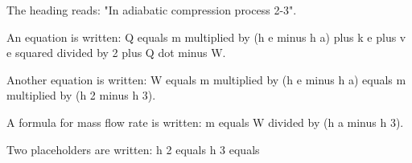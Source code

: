 The heading reads: "In adiabatic compression process 2-3".  

An equation is written:  
Q equals m multiplied by (h e minus h a) plus k e plus v e squared divided by 2 plus Q dot minus W.  

Another equation is written:  
W equals m multiplied by (h e minus h a) equals m multiplied by (h 2 minus h 3).  

A formula for mass flow rate is written:  
m equals W divided by (h a minus h 3).  

Two placeholders are written:  
h 2 equals  
h 3 equals